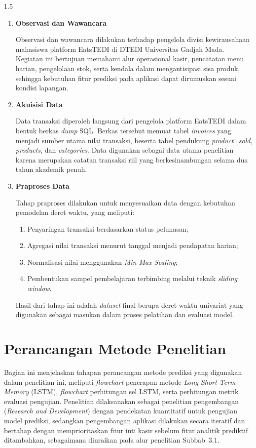 \documentclass[12pt, a4paper, onecolumn, oneside]{report}
\begin{document}
\begin{spacing}{1.5}
\begin{enumerate}[label=\alph*.]
    \item \textbf{Observasi dan Wawancara}

    Observasi dan wawancara dilakukan terhadap pengelola divisi kewirausahaan mahasiswa platform EatsTEDI di DTEDI Universitas Gadjah Mada. Kegiatan ini bertujuan memahami alur operasional kasir, pencatatan menu harian, pengelolaan stok, serta kendala dalam mengantisipasi sisa produk, sehingga kebutuhan fitur prediksi pada aplikasi dapat dirumuskan sesuai kondisi lapangan.

    \item \textbf{Akuisisi Data}

    Data transaksi diperoleh langsung dari pengelola platform EatsTEDI dalam bentuk berkas \textit{dump} SQL. Berkas tersebut memuat tabel \textit{invoices} yang menjadi sumber utama nilai transaksi, beserta tabel pendukung \textit{product\_sold}, \textit{products}, dan \textit{categories}. Data digunakan sebagai data utama penelitian karena merupakan catatan transaksi riil yang berkesinambungan selama dua tahun akademik penuh.

    \item \textbf{Praproses Data}

    Tahap praproses dilakukan untuk menyesuaikan data dengan kebutuhan pemodelan deret waktu, yang meliputi:
    \begin{enumerate}[label=\arabic*)]
        \item Penyaringan transaksi berdasarkan status pelunasan;
        \item Agregasi nilai transaksi menurut tanggal menjadi pendapatan harian;
        \item Normalisasi nilai menggunakan \textit{Min-Max Scaling};
        \item Pembentukan sampel pembelajaran terbimbing melalui teknik \textit{sliding window}.
    \end{enumerate}
    Hasil dari tahap ini adalah \textit{dataset} final berupa deret waktu univariat yang digunakan sebagai masukan dalam proses pelatihan dan evaluasi model.
\end{enumerate}

\section{Perancangan Metode Penelitian}

Bagian ini menjelaskan tahapan perancangan metode prediksi yang digunakan dalam penelitian ini, meliputi \textit{flowchart} penerapan metode \textit{Long Short-Term Memory} (LSTM), \textit{flowchart} perhitungan sel LSTM, serta perhitungan metrik evaluasi pengujian. Penelitian dilaksanakan sebagai penelitian pengembangan (\textit{Research and Development}) dengan pendekatan kuantitatif untuk pengujian model prediksi, sedangkan pengembangan aplikasi dilakukan secara iteratif dan bertahap dengan memprioritaskan fitur inti kasir sebelum fitur analitik prediktif ditambahkan, sebagaimana diuraikan pada alur penelitian Subbab~3.1.


\end{spacing}
\end{document}
